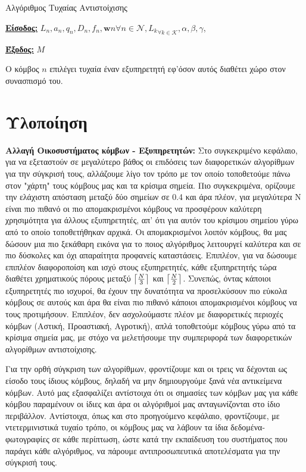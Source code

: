 \begin{algorithm}[h]
\caption{Αλγόριθμος Τυχαίας Αντιστοίχισης} \label{algorithm 4}
\begin{algorithmic}[1]
\STATE \textbf{\underline{Είσοδος:}} ${L_n, a_n, q_n, D_n, f_n, \mathbf{w}n}{\forall n\in \mathcal{N}}, {L_k}_{\forall k \in \mathcal{K}}, \alpha,\beta,\gamma$,

\STATE \textbf{\underline{Έξοδος:}}  $M$

\STATE Ο κόμβος $n$ επιλέγει τυχαία έναν εξυπηρετητή εφ'όσον αυτός διαθέτει χώρο στον συνασπισμό του.
\ENDFOR
\end{algorithmic}
\end{algorithm}
\vspace{-7pt}

\section{Υλοποίηση}

\textbf{Αλλαγή Οικοσυστήματος κόμβων - Εξυπηρετητών:} Στο συγκεκριμένο κεφάλαιο, για να εξεταστούν σε μεγαλύτερο βάθος οι επιδόσεις των διαφορετικών αλγορίθμων για την σύγκρισή τους, αλλάζουμε λίγο τον τρόπο με τον οποίο τοποθετούμε πάνω στον "χάρτη" τους κόμβους μας και τα κρίσιμα σημεία. Πιο συγκεκριμένα, ορίζουμε την ελάχιστη απόσταση μεταξύ δύο σημείων σε 0.4 και άρα πλέον, για μεγαλύτερα Ν είναι πιο πιθανό οι πιο απομακρισμένοι κόμβους να προσφέρουν καλύτερη χρησιμότητα για άλλους εξυπηρετητές, απ' ότι για αυτόν του κρίσιμου σημείου γύρω από το οποίο τοποθετήθηκαν αρχικά. Οι απομακρισμένοι λοιπόν κόμβους, θα μας δώσουν μια πιο ξεκάθαρη εικόνα για το ποιος αλγόριθμος λειτουργεί καλύτερα και σε πιο δύσκολες και όχι απαραίτητα προφανείς καταστάσεις. Επιπλέον, για να δώσουμε επιπλέον διαφοροποίση και ισχύ στους εξυπηρετητές, κάθε εξυπηρετητής τώρα διαθέτει χρηματικούς πόρους μεταξύ $\ceil*{\frac{N}{3}}$ και $\ceil*{\frac{N}{2}}$. Συνεπώς, όντας κάποιοι εξυπηρετητές πιο ισχυροί, θα έχουν την δυνατότητα να προσελκύσουν πιο εύκολα κόμβους σε αυτούς και άρα θα είναι πιο πιθανό κάποιοι απομακρισμένοι κόμβους να τους προτιμήσουν. Επιπλέον, δεν ασχολούμαστε πλέον με διαφορετικές περιοχές κόμβων (Αστική, Προαστιακή, Αγροτική), απλά τοποθετούμε κόμβους γύρω από τα κρίσιμα σημεία μας, με στόχο να μελετήσουμε την συμπεριφορά των διαφορετικών αλγορίθμων αντιστοίχισης.

Για την ορθή σύγκριση των αλγορίθμων, φροντίζουμε και οι τρεις να δέχονται ως είσοδο τους ίδιους κόμβους, δηλαδή να μην δημιουργούμε ξανά νέα αντικείμενα κόμβων. Αυτό μας εξασφαλίζει αντίστοιχα ότι οι σημασίες των κόμβων μας για κάθε κόμβου παραμένουν οι ίδιες και άρα οι αλγόριθμοί μας ανταγωνίζονται στο ίδιο περιβάλλον. Αντίστοιχα, όπως και στο προηγούμενο κεφάλαιο, φροντίζουμε, με ντετερμινιστικά τυχαίο τρόπο, οι κόμβους μας να λάβουν τα ίδια δεδομένα-φωτογραφίες σε κάθε περίπτωση, ώστε κατά την εκπαίδευση του συστήματος που παράγει κάθε αλγόριθμος, να πάρουμε αντιπροσωπευτικά αποτελέσματα για την σύγκρισή τους. 

